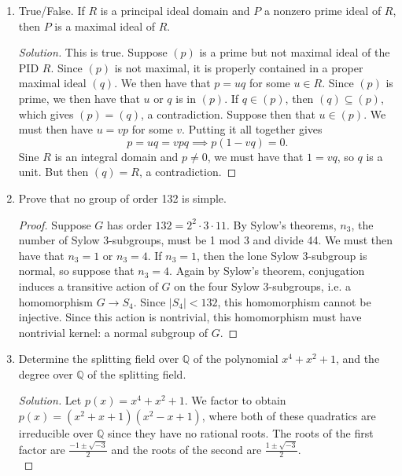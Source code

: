 \documentclass[11pt,letterpaper]{report}
\newcommand{\rationals}{\mathbb{Q}}
\newenvironment{solution}
{\begin{proof}[Solution]}
{\end{proof}}
\begin{document}
\begin{enumerate}
\begin{solution}
		Finally, suppose that $F$ is not finite and has characteristic 2. The equation $x^2 = 1$ has exactly one solution in $F$, namely 1. However, the corresponding equation $2x=0$ has every element in $F$ as a solution. Since $F$ contains more than one element, we conclude that these groups are not isomorphic.
	\end{solution}

	\item True/False. If $R$ is a principal ideal domain and $P$ a nonzero prime ideal of $R$, then $P$ is a maximal ideal of $R$.
	\begin{solution}
		This is true. Suppose $(p)$ is a prime but not maximal ideal of the PID $R$. Since $(p)$ is not maximal, it is properly contained in a proper maximal ideal $(q)$. We then have that $p = uq$ for some $u\in R$. Since $(p)$ is prime, we then have that $u$ or $q$ is in $(p)$. If $q\in (p)$, then $(q)\subseteq (p)$, which gives $(p) = (q)$, a contradiction. Suppose then that $u\in (p)$. We must then have $u = vp$ for some $v$. Putting it all together gives
		\[
		p = uq = vpq \implies p(1-vq) = 0.
		\]
		Sine $R$ is an integral domain and $p\neq 0$, we must have that $1 = vq$, so $q$ is a unit. But then $(q) = R$, a contradiction.
	\end{solution}

	\item Prove that no group of order 132 is simple.
	\begin{proof}
		Suppose $G$ has order $132 = 2^2\cdot 3\cdot 11$. By Sylow's theorems, $n_3$, the number of Sylow 3-subgroups, must be 1 mod 3 and divide 44. We must then have that $n_3= 1$ or $n_3 = 4$. If $n_3 = 1$, then the lone Sylow 3-subgroup is normal, so suppose that $n_3 = 4$. Again by Sylow's theorem, conjugation induces a transitive action of $G$ on the four Sylow 3-subgroups, i.e. a homomorphism $G\to S_4$. Since $|S_4|<132$, this homomorphism cannot be injective. Since this action is nontrivial, this homomorphism must have nontrivial kernel: a normal subgroup of $G$.
	\end{proof}

	\item Determine the splitting field over $\rationals$ of the polynomial $x^4+x^2+1$, and the degree over $\rationals$ of the splitting field.
	\begin{solution}
		Let $p(x) = x^4+x^2+1$. We factor to obtain $p(x) = (x^2 + x + 1)(x^2-x+1)$, where both of these quadratics are irreducible over $\rationals$ since they have no rational roots. The roots of the first factor are $\frac{-1\pm \sqrt{-3}}{2}$ and the roots of the second are $\frac{1\pm \sqrt{-3}}{2}$.\\


\end{solution}
\end{enumerate}
\end{document}
